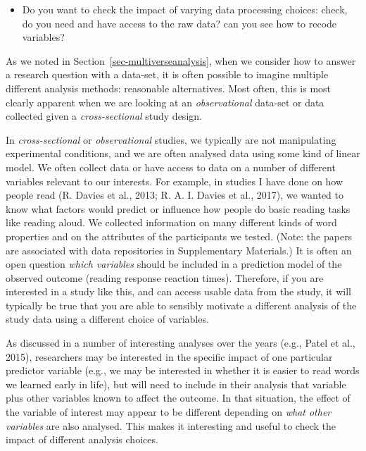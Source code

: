 \documentclass[
  letterpaper,
  DIV=11,
  numbers=noendperiod]{scrreprt}
\providecommand{\tightlist}{%
  \setlength{\itemsep}{0pt}\setlength{\parskip}{0pt}}\usepackage{longtable,booktabs,array}
\begin{document}
\begin{tcolorbox}[enhanced jigsaw, opacitybacktitle=0.6, title=\textcolor{quarto-callout-tip-color}{\faLightbulb}\hspace{0.5em}{Tip}, arc=.35mm, colbacktitle=quarto-callout-tip-color!10!white, colframe=quarto-callout-tip-color-frame, leftrule=.75mm, opacityback=0, breakable, titlerule=0mm, left=2mm, bottomrule=.15mm, toprule=.15mm, colback=white, coltitle=black, bottomtitle=1mm, toptitle=1mm, rightrule=.15mm]

\begin{itemize}
\tightlist
\item
  Do you want to check the impact of varying data processing choices:
  check, do you need and have access to the raw data? can you see how to
  recode variables?
\end{itemize}

\end{tcolorbox}

As we noted in Section~\ref{sec-multiverseanalysis}, when we consider
how to answer a research question with a data-set, it is often possible
to imagine multiple different analysis methods: reasonable alternatives.
Most often, this is most clearly apparent when we are looking at an
\emph{observational} data-set or data collected given a
\emph{cross-sectional} study design.

In \emph{cross-sectional} or \emph{observational} studies, we typically
are not manipulating experimental conditions, and we are often analysed
data using some kind of linear model. We often collect data or have
access to data on a number of different variables relevant to our
interests. For example, in studies I have done on how people read (R.
Davies et al., 2013; R. A. I. Davies et al., 2017), we wanted to know
what factors would predict or influence how people do basic reading
tasks like reading aloud. We collected information on many different
kinds of word properties and on the attributes of the participants we
tested. (Note: the papers are associated with data repositories in
Supplementary Materials.) It is often an open question \emph{which
variables} should be included in a prediction model of the observed
outcome (reading response reaction times). Therefore, if you are
interested in a study like this, and can access usable data from the
study, it will typically be true that you are able to sensibly motivate
a different analysis of the study data using a different choice of
variables.

As discussed in a number of interesting analyses over the years (e.g.,
Patel et al., 2015), researchers may be interested in the specific
impact of one particular predictor variable (e.g., we may be interested
in whether it is easier to read words we learned early in life), but
will need to include in their analysis that variable plus other
variables known to affect the outcome. In that situation, the effect of
the variable of interest may appear to be different depending on
\emph{what other variables} are also analysed. This makes it interesting
and useful to check the impact of different analysis choices.
\end{document}
